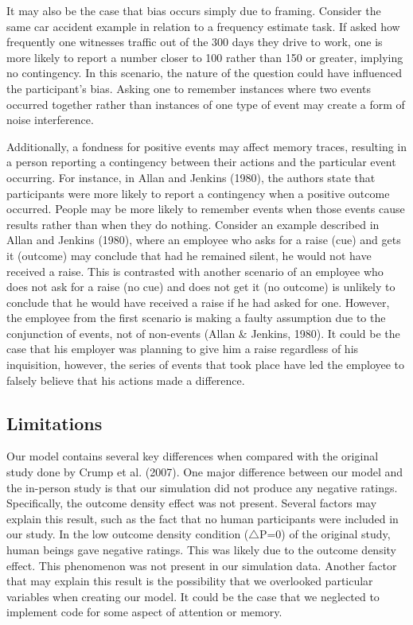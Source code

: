 \documentclass[
  english,
  man,floatsintext]{apa6}
\begin{document}
It may also be the case that bias occurs simply due to framing. Consider the same car accident example in relation to a frequency estimate task. If asked how frequently one witnesses traffic out of the 300 days they drive to work, one is more likely to report a number closer to 100 rather than 150 or greater, implying no contingency. In this scenario, the nature of the question could have influenced the participant's bias. Asking one to remember instances where two events occurred together rather than instances of one type of event may create a form of noise interference.

Additionally, a fondness for positive events may affect memory traces, resulting in a person reporting a contingency between their actions and the particular event occurring. For instance, in Allan and Jenkins (1980), the authors state that participants were more likely to report a contingency when a positive outcome occurred. People may be more likely to remember events when those events cause results rather than when they do nothing. Consider an example described in Allan and Jenkins (1980), where an employee who asks for a raise (cue) and gets it (outcome) may conclude that had he remained silent, he would not have received a raise. This is contrasted with another scenario of an employee who does not ask for a raise (no cue) and does not get it (no outcome) is unlikely to conclude that he would have received a raise if he had asked for one. However, the employee from the first scenario is making a faulty assumption due to the conjunction of events, not of non-events (Allan \& Jenkins, 1980). It could be the case that his employer was planning to give him a raise regardless of his inquisition, however, the series of events that took place have led the employee to falsely believe that his actions made a difference.

\hypertarget{limitations}{%
\subsection{Limitations}\label{limitations}}

Our model contains several key differences when compared with the original study done by Crump et al. (2007). One major difference between our model and the in-person study is that our simulation did not produce any negative ratings. Specifically, the outcome density effect was not present. Several factors may explain this result, such as the fact that no human participants were included in our study. In the low outcome density condition (\(\triangle\)P=0) of the original study, human beings gave negative ratings. This was likely due to the outcome density effect. This phenomenon was not present in our simulation data. Another factor that may explain this result is the possibility that we overlooked particular variables when creating our model. It could be the case that we neglected to implement code for some aspect of attention or memory.
\end{document}
